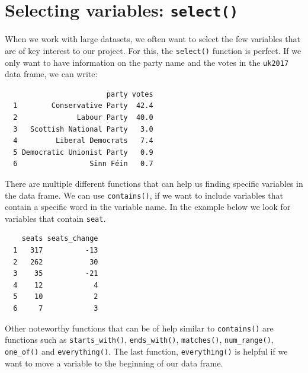 \documentclass[12pt,oneside]{reedthesis}
\theoremstyle{definition}
\theoremstyle{definition}
\theoremstyle{definition}
\theoremstyle{remark}
\begin{document}
  \section{\texorpdfstring{Selecting variables:
  \texttt{select()}}{Selecting variables: select()}}\label{selecting-variables-select}
  
  When we work with large datasets, we often want to select the few
  variables that are of key interest to our project. For this, the
  \texttt{select()} function is perfect. If we only want to have
  information on the party name and the votes in the \texttt{uk2017} data
  frame, we can write:
  \begin{Shaded}
  \begin{Highlighting}[]
  \end{Highlighting}
  \end{Shaded}
  \begin{verbatim}
                        party votes
  1        Conservative Party  42.4
  2              Labour Party  40.0
  3   Scottish National Party   3.0
  4         Liberal Democrats   7.4
  5 Democratic Unionist Party   0.9
  6                 Sinn Féin   0.7
  \end{verbatim}
  There are multiple different functions that can help us finding specific
  variables in the data frame. We can use \texttt{contains()}, if we want
  to include variables that contain a specific word in the variable name.
  In the example below we look for variables that contain \texttt{seat}.
  \begin{Shaded}
  \begin{Highlighting}[]
  \NormalTok{(}\NormalTok{))}
  \end{Highlighting}
  \end{Shaded}
  \begin{verbatim}
    seats seats_change
  1   317          -13
  2   262           30
  3    35          -21
  4    12            4
  5    10            2
  6     7            3
  \end{verbatim}
  Other noteworthy functions that can be of help similar to
  \texttt{contains()} are functions such as \texttt{starts\_with()},
  \texttt{ends\_with()}, \texttt{matches()}, \texttt{num\_range()},
  \texttt{one\_of()} and \texttt{everything()}. The last function,
  \texttt{everything()} is helpful if we want to move a variable to the
  beginning of our data frame.
  \begin{Shaded}
  \begin{Highlighting}[]
  \NormalTok{())}
  \end{Highlighting}
  \end{Shaded}
\end{document}
